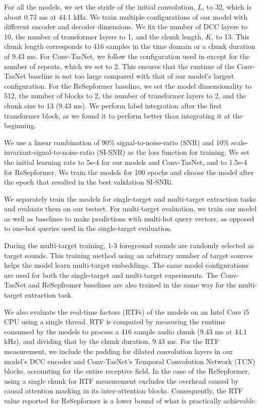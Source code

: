 For all the models, we set the stride of the initial convolution, $L$, to 32, which is  about $0.73$ ms at 44.1 kHz. We train multiple configurations of our model with different encoder and decoder dimensions. We fix the number of DCC layers to 10, the number of transformer layers to 1, and the chunk length, $K$, to 13. This chunk length corresponds to 416 samples in the time domain or a chunk duration of 9.43 ms.   
For Conv-TasNet, we follow the configuration used in \cite{2020arXiv200605712O} except for the number of repeats, which we set to 2. This ensures that the runtime of the Conv-TasNet baseline is not too large compared with that of our model's largest configuration. For the ReSepformer baseline, we set the model dimensionality to 512, the number of blocks to 2, the number of transformer layers to 2, and the chunk size to 13 (9.43 ms). We perform label integration after the first transformer block, as we found it to perform better than integrating it  at the beginning.

\vskip 0.05in { We use a linear combination of 90\% signal-to-noise-ratio (SNR) and 10\% scale-invariant-signal-to-noise-ratio (SI-SNR) \cite{https://doi.org/10.48550/arxiv.1811.02508} as the loss function for training.
We set the initial learning rate to 5e-4 for our models and Conv-TasNet, and to 1.5e-4 for  ReSepformer. We train the models for 100 epochs and choose the model after the epoch that resulted in the best validation SI-SNRi.
}


\vskip 0.05in We separately train the models for single-target and multi-target extraction tasks and evaluate them on our testset. For multi-target evaluation, we train our model as well as baselines to make predictions with multi-hot query vectors, as opposed to one-hot queries used in the single-target evaluation. { During the multi-target training, 1-3 foreground sounds are randomly selected as target sounds. This training method using an arbitrary number of target sources helps the model learn multi-target embeddings. The same model configurations are used for both the single-target and multi-target experiments.  The Conv-TasNet and ReSepfromer baselines are also trained in the same way for the multi-target extraction task.


We also evaluate the real-time factors (RTFs) of the models on an Intel Core i5 CPU using a single thread. RTF is computed by measuring the runtime consumed by the models to process a 416 sample audio chunk (9.43 ms at 44.1 kHz), and dividing that by the chunk duration, 9.43 ms. {For the RTF measurement, we include the padding for dilated convolution layers in our model's DCC encoder and Conv-TasNet's Temporal Convolution Network (TCN) blocks, accounting for the entire receptive field. In the case of the ReSepformer, using a single chunk for RTF measurement excludes the overhead caused by causal attention masking in its inter-attention blocks. Consequently, the RTF value reported for ReSepformer is a lower bound of what is practically achievable.}}

